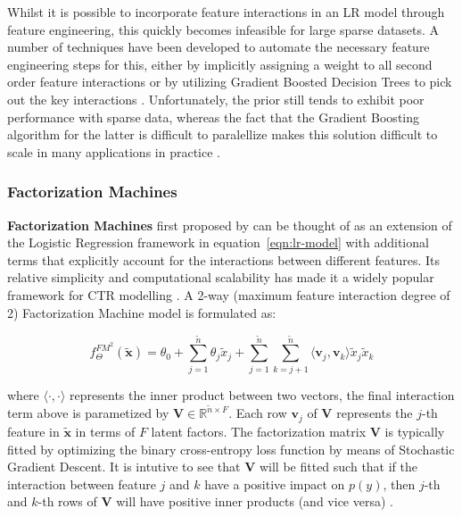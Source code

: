 \documentclass{mldsmsc}
\begin{document}
Whilst it is possible to incorporate feature interactions in an LR model through feature
engineering, this quickly becomes infeasible for large sparse datasets. A number of techniques
have been developed to automate the necessary feature engineering steps for this, either by
implicitly assigning a weight to all second order feature interactions \citep{RefWorks:chang2010training}
or by utilizing Gradient Boosted Decision Trees to pick out the key interactions \citep{RefWorks:cheng2014gradient}.
Unfortunately, the prior still tends to exhibit poor performance with sparse data, 
whereas the fact that the Gradient Boosting algorithm for the latter is difficult to paralellize
makes this solution difficult to scale in many applications in practice \citep{RefWorks:zhang2021deep}.

\subsubsection{Factorization Machines}

\textbf{Factorization Machines} first proposed by \cite{RefWorks:rendle2010factorization} can 
be thought of as an extension of the Logistic Regression framework in equation~\ref{eqn:lr-model}
with additional terms that explicitly account for the interactions between different features.
Its relative simplicity and computational scalability has made it a widely popular framework
for CTR modelling \citep{RefWorks:gu2021ad}. 
A 2-way (maximum feature interaction degree of 2) Factorization Machine model is formulated as:

\begin{equation}
\label{eqn:fm-2way}
f_{\Theta}^{FM^2}(\tilde{\mathbf{x}}) = \theta_0 + \sum_{j=1}^{\tilde{n}} \theta_{j} \tilde{x}_j
+ \sum_{j=1}^{\tilde{n}} \sum_{k=j+1}^{\tilde{n}} \langle \mathbf{v}_j , \mathbf{v}_k \rangle \tilde{x}_j \tilde{x}_k
\end{equation}

where $\langle \cdot , \cdot \rangle$ represents the inner product between two vectors, the final
interaction term above is parametized by $\mathbf{V} \in \mathbb{R}^{\tilde{n} \times F}$. Each
row $\mathbf{v}_j$ of $\mathbf{V}$ represents the $j$-th feature in $\tilde{\mathbf{x}}$ in terms
of $F$ latent factors. The factorization matrix $\mathbf{V}$ is typically fitted by optimizing
the binary cross-entropy loss function by means of Stochastic Gradient Descent. It is 
intutive to see that $\mathbf{V}$ will be fitted such that if the interaction
between feature $j$ and $k$ have a positive impact on $p(y)$, then $j$-th and 
$k$-th rows of $\mathbf{V}$ will have positive inner products (and vice versa) \citep{RefWorks:zhang2021deep}.
\end{document}
